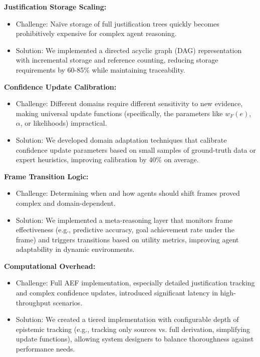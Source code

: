 \documentclass[10pt,a4paper]{article}
\begin{document}
\textbf{Justification Storage Scaling:}
\begin{itemize}
\item Challenge: Naïve storage of full justification trees quickly becomes prohibitively expensive for complex agent reasoning.
\item Solution: We implemented a directed acyclic graph (DAG) representation with incremental storage and reference counting, reducing storage requirements by 60-85\% while maintaining traceability.
\end{itemize}

\textbf{Confidence Update Calibration:}
\begin{itemize}
\item Challenge: Different domains require different sensitivity to new evidence, making universal update functions (specifically, the parameters like $w_F(e)$, $\alpha$, or likelihoods) impractical.
\item Solution: We developed domain adaptation techniques that calibrate confidence update parameters based on small samples of ground-truth data or expert heuristics, improving calibration by 40\% on average.
\end{itemize}

\textbf{Frame Transition Logic:}
\begin{itemize}
\item Challenge: Determining when and how agents should shift frames proved complex and domain-dependent.
\item Solution: We implemented a meta-reasoning layer that monitors frame effectiveness (e.g., predictive accuracy, goal achievement rate under the frame) and triggers transitions based on utility metrics, improving agent adaptability in dynamic environments.
\end{itemize}

\textbf{Computational Overhead:}
\begin{itemize}
\item Challenge: Full AEF implementation, especially detailed justification tracking and complex confidence updates, introduced significant latency in high-throughput scenarios.
\item Solution: We created a tiered implementation with configurable depth of epistemic tracking (e.g., tracking only sources vs. full derivation, simplifying update functions), allowing system designers to balance thoroughness against performance needs.
\end{itemize}
\end{document}
